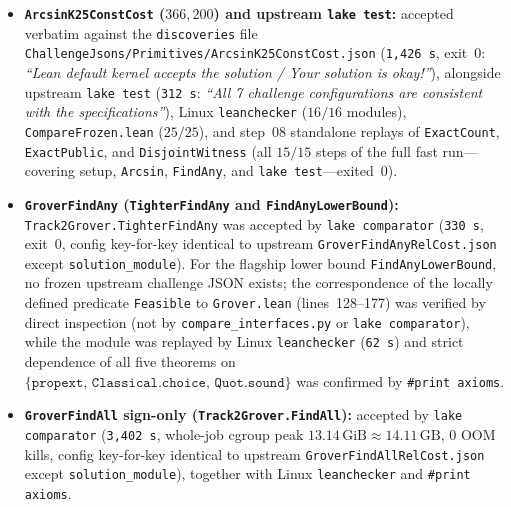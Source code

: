 \documentclass[11pt,a4paper]{article}
\theoremstyle{definition}
\theoremstyle{remark}
\begin{document}
\begin{itemize}
\item \textbf{\texttt{ArcsinK25\allowbreak ConstCost} (\(366{,}200\)) and upstream \texttt{lake test}:} accepted verbatim against the \texttt{discoveries} file \texttt{Challenge\allowbreak Jsons/\allowbreak Primitives/\allowbreak Arcsin\allowbreak K25\allowbreak Const\allowbreak Cost.json} (\texttt{1,426\,s}, exit~\(0\): \emph{``Lean default kernel accepts the solution / Your solution is okay!''}), alongside upstream \texttt{lake test} (\texttt{312\,s}: \emph{``All 7 challenge configurations are consistent with the specifications''}), Linux \texttt{leanchecker} (\(16/16\) modules), \texttt{Compare\allowbreak Frozen.lean} (\(25/25\)), and step~08 standalone replays of \texttt{Exact\allowbreak Count}, \texttt{Exact\allowbreak Public}, and \texttt{Disjoint\allowbreak Witness} (all \(15/15\) steps of the full fast run---covering setup, \texttt{Arcsin}, \texttt{FindAny}, and \texttt{lake test}---exited~\(0\)).
\item \textbf{\texttt{GroverFindAny} (\texttt{Tighter\allowbreak FindAny} and \texttt{FindAny\allowbreak LowerBound}):} \texttt{Track2Grover.\allowbreak Tighter\allowbreak FindAny} was accepted by \texttt{lake comparator} (\texttt{330\,s}, exit~\(0\), config key-for-key identical to upstream \texttt{Grover\allowbreak FindAny\allowbreak RelCost.json} except \texttt{solution\_\allowbreak module}). For the flagship lower bound \texttt{FindAny\allowbreak LowerBound}, no frozen upstream challenge JSON exists; the correspondence of the locally defined predicate \texttt{Feasible} to \texttt{Grover.lean} (lines~128--177) was verified by direct inspection (not by \texttt{compare\_\allowbreak interfaces.py} or \texttt{lake comparator}), while the module was replayed by Linux \texttt{leanchecker} (\texttt{62\,s}) and strict dependence of all five theorems on \(\{\texttt{propext},\allowbreak\,\texttt{Classical.choice},\allowbreak\,\texttt{Quot.sound}\}\) was confirmed by \texttt{\#print axioms}.
\item \textbf{\texttt{GroverFindAll} sign-only (\texttt{Track2Grover.\allowbreak FindAll}):} accepted by \texttt{lake comparator} (\texttt{3,402\,s}, whole-job cgroup peak \(13.14\,\mathrm{GiB} \approx 14.11\,\mathrm{GB}\), \(0\) OOM kills, config key-for-key identical to upstream \texttt{Grover\allowbreak FindAll\allowbreak RelCost.json} except \texttt{solution\_\allowbreak module}), together with Linux \texttt{leanchecker} and \texttt{\#print axioms}.

\end{itemize}
\end{document}
